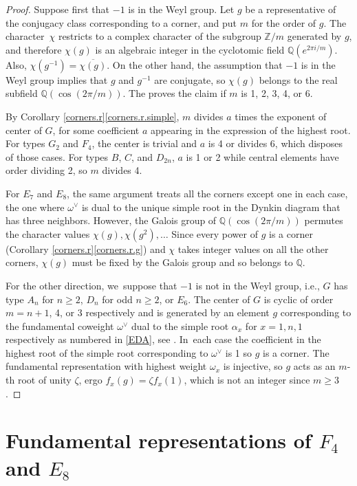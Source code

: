 \documentclass[JEP,XML,SOM,Unicode,NoFloatCountersInSection,published]{cedram}
\theoremstyle{definition}
\newcommand{\Q}{\mathbb{Q}}
\newcommand{\Z}{\mathbb{Z}}
\newcommand{\ov}{\omega^\vee}
\begin{document}
\begin{proof}
Suppose first that $-1$ is in the Weyl group. Let $g$ be a representative of the conjugacy class corresponding to a corner, and put $m$ for the order of $g$. The char\-ac\-ter~$\chi$ restricts to a complex character of the subgroup $\Z/m$ generated by $g$, and therefore $\chi(g)$ is an algebraic integer in the cyclotomic field $\Q(e^{2\pi i/m})$. Also, $\chi(g^{-1})=\overline{\chi(g)}$. On the other hand, the assumption that $-1$ is in the Weyl group implies that $g$ and $g^{-1}$ are conjugate, so $\chi(g)$ belongs to the real subfield $\Q(\cos(2\pi/m))$. The proves the claim if $m$ is 1, 2, 3, 4, or 6.

By Corollary \ref{corners.r}\eqref{corners.r.simple}, $m$ divides $a$ times the exponent of center of $G$, for some coefficient $a$ appearing in the expression of the highest root. For types $G_2$ and $F_4$, the center is trivial and $a$ is 4 or divides 6, which disposes of those cases.
For types $B$, $C$, and $D_{2n}$, $a$ is 1 or 2 while central elements have order dividing 2, so $m$ divides 4.

For $E_7$ and $E_8$, the same argument treats all the corners except one in each case, the one where $\ov$ is dual to the unique simple root in the Dynkin diagram that has three neighbors. However, the Galois group of $\Q(\cos(2\pi/m))$ permutes the character values $\chi(g), \chi(g^2), \ldots$ Since every power of $g$ is a corner (Corollary \ref{corners.r}\eqref{corners.r.g}) and $\chi$ takes integer values on all the other corners, $\chi(g)$ must be fixed by the Galois group and so belongs to $\Q$.

For the other direction, we~suppose that $-1$ is not in the Weyl group, i.e., $G$ has type $A_n$ for $n \ge 2$, $D_n$ for odd $n \ge 2$, or $E_6$. The center of $G$ is cyclic of order $m = n+1$, 4, or 3 respectively and is generated by an element $g$ corresponding to the fundamental coweight $\ov$ dual to the simple root $\alpha_x$ for $x = 1, n, 1$ respectively as numbered in \eqref{EDA}, see \cite[p.\,298, Table 3]{OV:LGAG}. In~each case the coefficient in the highest root of the simple root corresponding to $\ov$ is 1 so $g$ is a corner. The fundamental representation with highest weight $\omega_x$ is injective, so $g$ acts as an $m$-th root of unity $\zeta$, ergo $f_x(g) = \zeta f_x(1)$, which is not an integer since $m \ge 3$.
\end{proof}

\section{Fundamental representations of \texorpdfstring{$F_4$}{F4} and \texorpdfstring{$E_8$}{E8}} \label{E8.sec}
\end{document}
